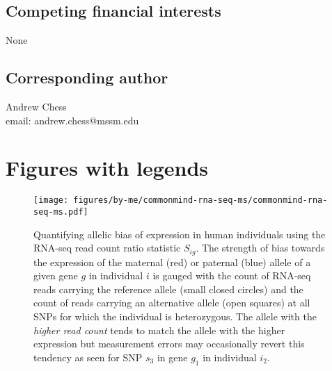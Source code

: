 \documentclass[letterpaper]{article}
\begin{document}
\subsection{Competing financial interests}

None

\subsection{Corresponding author}

Andrew Chess\\
email: andrew.chess@mssm.edu

\clearpage

\section{Figures with legends}

\begin{figure}[H]
\begin{center}
\texttt{[image: figures/by-me/commonmind-rna-seq-ms/commonmind-rna-seq-ms.pdf]}
\end{center}
\caption{Quantifying allelic bias of expression in human
individuals using the RNA-seq read count ratio statistic \(S_{ig}\).
The strength of
bias towards the expression of the maternal (red) or paternal (blue) allele of
a given gene \(g\) in individual \(i\) is gauged with the count of RNA-seq
reads carrying the reference allele (small closed circles) and the count of
reads carrying an alternative allele (open squares) at all SNPs for which the
individual is heterozygous.  The allele with the \emph{higher read count} tends to
match the allele with the higher expression but measurement errors may
occasionally revert this tendency as seen for SNP \(s_3\) in gene \(g_1\) in
individual \(i_2\).  }
\label{fig:study-design}
\end{figure}
\end{document}
